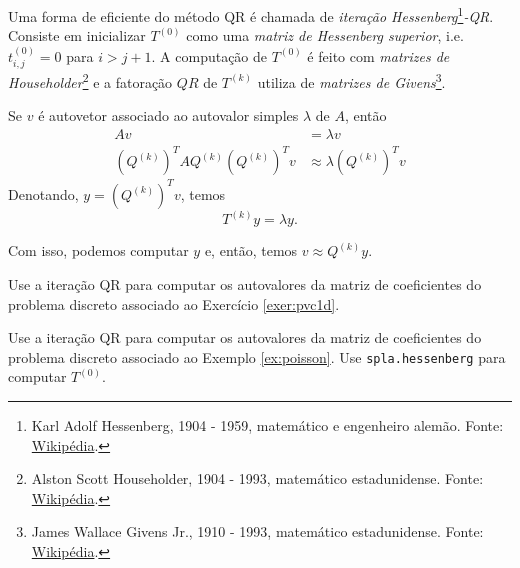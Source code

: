 Uma forma de eficiente do método QR é chamada de \emph{iteração Hessenberg}\footnote{Karl Adolf Hessenberg, 1904 - 1959, matemático e engenheiro alemão. Fonte: \href{https://pt.wikipedia.org/wiki/Karl_Hessenberg}{Wikipédia}.}\emph{-QR}. Consiste em inicializar $T^{(0)}$ como uma \emph{matriz de Hessenberg superior}, i.e. $t^{(0)}_{i,j}=0$ para $i>j+1$. A computação de $T^{(0)}$ é feito com \emph{matrizes de Householder}\footnote{Alston Scott Householder, 1904 - 1993, matemático estadunidense. Fonte: \href{https://pt.wikipedia.org/wiki/Alston_Scott_Householder}{Wikipédia}.} e a fatoração $QR$ de $T^{(k)}$ utiliza de \emph{matrizes de Givens}\footnote{James Wallace Givens Jr., 1910 - 1993, matemático estadunidense. Fonte: \href{https://pt.wikipedia.org/wiki/Wallace_Givens}{Wikipédia}.}.



\begin{obs}
  Se $v$ é autovetor associado ao autovalor simples $\lambda$ de $A$, então
  \begin{align}
    Av &= \lambda v\\
    (Q^{(k)})^TAQ^{(k)}(Q^{(k)})^Tv &\approx \lambda (Q^{(k)})^Tv
  \end{align}
  Denotando, $y = (Q^{(k)})^Tv$, temos
  \begin{equation}
    T^{(k)}y = \lambda y.
  \end{equation}

  Com isso, podemos computar $y$ e, então, temos $v\approx Q^{(k)}y$.
\end{obs}


\begin{exer}
  Use a iteração QR para computar os autovalores da matriz de coeficientes do problema discreto associado ao Exercício \ref{exer:pvc1d}.
\end{exer}

\begin{exer}
  Use a iteração QR para computar os autovalores da matriz de coeficientes do problema discreto associado ao Exemplo \ref{ex:poisson}. Use \lstinline+spla.hessenberg+ para computar $T^{(0)}$.
\end{exer}
